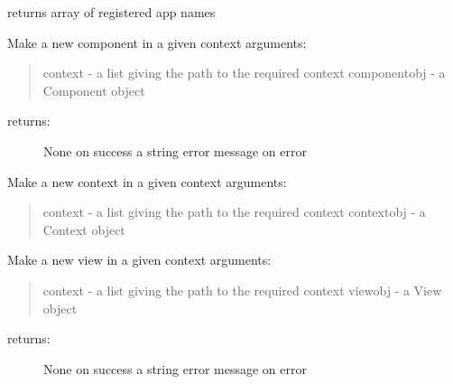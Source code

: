 \documentclass[letterpaper,10pt,english]{sphinxmanual}
\begin{document}
\begin{fulllineitems}
\begin{fulllineitems}
\label{API:personis.client.Access.listapps}
returns array of registered app names

\end{fulllineitems}


\begin{fulllineitems}
\label{API:personis.client.Access.mkcomponent}
Make a new component in a given context
arguments:
\begin{quote}

context - a list giving the path to the required context
componentobj - a Component object
\end{quote}
\begin{description}
\item[{returns:}] \leavevmode
None on success
a string error message on error

\end{description}

\end{fulllineitems}


\begin{fulllineitems}
\label{API:personis.client.Access.mkcontext}
Make a new context in a given context
arguments:
\begin{quote}

context - a list giving the path to the required context
contextobj - a Context object
\end{quote}

\end{fulllineitems}


\begin{fulllineitems}
\label{API:personis.client.Access.mkview}
Make a new view in a given context
arguments:
\begin{quote}

context - a list giving the path to the required context
viewobj - a View object
\end{quote}
\begin{description}
\item[{returns:}] \leavevmode
None on success
a string error message on error


\end{description}
\end{fulllineitems}
\end{fulllineitems}
\end{document}
